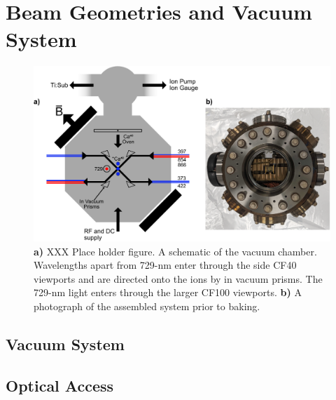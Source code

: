 \section{Beam Geometries and Vacuum System}
\label{sec:Vacuum System}

\begin{figure}
  \begin{center}
   \noindent\includegraphics[width=0.9\linewidth]{figures/pdf_figure/vacuum_can-crop.pdf}
  \end{center}
  \caption{
    \textbf{a)} XXX Place holder figure. A schematic of the vacuum chamber.
    Wavelengths apart from 729-nm enter through the side CF40 viewports and are
    directed onto the ions by in vacuum prisms. The 729-nm light enters through
    the larger CF100 viewports.  \textbf{b)} A photograph of the assembled
    system prior to baking.
  }
  \label{fig:can}
\end{figure}

\subsection{Vacuum System}

\subsection{Optical Access}

